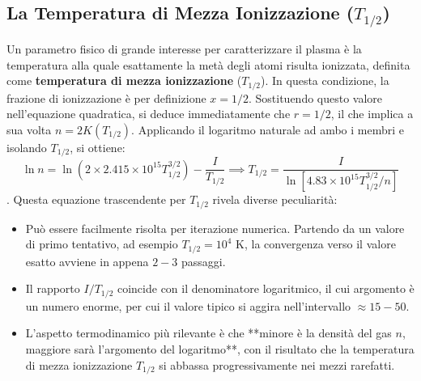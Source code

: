 \subsection{La Temperatura di Mezza Ionizzazione ($T_{1/2}$)}
Un parametro fisico di grande interesse per caratterizzare il plasma è la temperatura alla quale esattamente la metà degli atomi risulta ionizzata, definita come \textbf{temperatura di mezza ionizzazione} ($T_{1/2}$). In questa condizione, la frazione di ionizzazione è per definizione $x = 1/2$. Sostituendo questo valore nell'equazione quadratica, si deduce immediatamente che $r = 1/2$, il che implica a sua volta $n = 2K(T_{1/2})$.
Applicando il logaritmo naturale ad ambo i membri e isolando $T_{1/2}$, si ottiene:
\begin{equation}
\ln n = \ln \left( 2 \times 2.415 \times 10^{15} T_{1/2}^{3/2} \right) - \frac{I}{T_{1/2}} \implies T_{1/2} = \frac{I}{\ln \left[ 4.83 \times 10^{15} T_{1/2}^{3/2} / n \right]}
\end{equation}
.
Questa equazione trascendente per $T_{1/2}$ rivela diverse peculiarità:
\begin{itemize}
\item Può essere facilmente risolta per iterazione numerica. Partendo da un valore di primo tentativo, ad esempio $T_{1/2} = 10^4 \text{ K}$, la convergenza verso il valore esatto avviene in appena $2-3$ passaggi.
\item Il rapporto $I/T_{1/2}$ coincide con il denominatore logaritmico, il cui argomento è un numero enorme, per cui il valore tipico si aggira nell'intervallo $\approx 15-50$.
\item L'aspetto termodinamico più rilevante è che **minore è la densità del gas $n$, maggiore sarà l'argomento del logaritmo**, con il risultato che la temperatura di mezza ionizzazione $T_{1/2}$ si abbassa progressivamente nei mezzi rarefatti.
\end{itemize}

